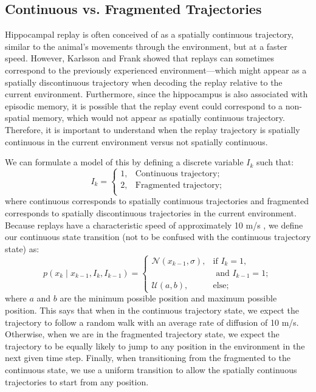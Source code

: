 \documentclass[conference]{IEEEtran}
\begin{document}
\subsection{Continuous vs. Fragmented Trajectories}
Hippocampal replay is often conceived of as a spatially continuous trajectory, similar to the animal's movements through the environment, but at a faster speed. However, Karlsson and Frank \cite{KarlssonAwakereplayremote2009} showed that replays can sometimes correspond to the previously experienced environment---which might appear as a spatially discontinuous trajectory when decoding the replay relative to the current environment. Furthermore, since the hippocampus is also associated with episodic memory, it is possible that the replay event could correspond to a non-spatial memory, which would not appear as spatially continuous trajectory. Therefore, it is important to understand when the replay trajectory is spatially continuous in the current environment versus not spatially continuous.

We can formulate a model of this by defining a discrete variable $I_{k}$ such that:
\begin{equation}
    I_{k} = \begin{cases}
        1, & \text{Continuous trajectory};\\
        2, & \text{Fragmented trajectory};\\
         \end{cases}
\end{equation}
where continuous corresponds to spatially continuous trajectories and fragmented corresponds to spatially discontinuous trajectories in the current environment. Because replays have a characteristic speed of approximately 10 m/s \cite{DavidsonHippocampalReplayExtended2009}, we define our continuous state transition (not to be confused with the continuous trajectory state) as:
\begin{equation}
    p(x_{k} \mid x_{k-1}, I_{k}, I_{k-1}) = \begin{cases}
        \mathcal{N}(x_{k-1}, \sigma), & \text{if } I_{k}=1, \\
         & \text{ and } I_{k-1}=1;\\
        \mathcal{U}(a, b), & \text{else;}
    \end{cases}        
\end{equation}
where $a$ and $b$ are the minimum possible position and maximum possible position. This says that when in the continuous trajectory state, we expect the trajectory to follow a random walk with an average rate of diffusion of 10 m/s. Otherwise, when we are in the fragmented trajectory state, we expect the trajectory to be equally likely to jump to any position in the environment in the next given time step. Finally, when transitioning from the fragmented to the continuous state, we use a uniform transition to allow the spatially continuous trajectories to start from any position.
\end{document}

